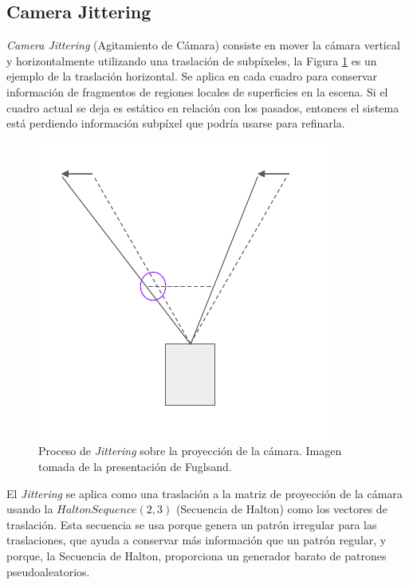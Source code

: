 \documentclass{cslthse-msc}
\begin{document}
\subsection{Camera Jittering}
\textit{Camera Jittering} (Agitamiento de Cámara) consiste en mover la cámara vertical y horizontalmente utilizando una traslación de subpíxeles, la Figura \ref{fig:camerajittering} es un ejemplo de la traslación horizontal. Se aplica en cada cuadro para conservar información de fragmentos de regiones locales de superficies en la escena. Si el cuadro actual se deja es estático en relación con los pasados, entonces el sistema está perdiendo información subpíxel que podría usarse para refinarla. ~\cite{Fuglsand2016, XU2016}

\begin{figure}[!hbt]
	\centering
	\includegraphics[scale=0.3]{images/camera_jitter.png}
	\caption{Proceso de \textit{Jittering} sobre la proyección de la cámara. Imagen tomada de la presentación de Fuglsand. \protect\cite{Fuglsand2016}}\label{fig:camerajittering}
\end{figure}

El \textit{Jittering} se aplica como una traslación a la matriz de proyección de la cámara usando la $Halton Sequence (2,3)$ (Secuencia de Halton) como los vectores de traslación. Esta secuencia se usa porque genera un patrón irregular para las traslaciones, que ayuda a conservar más información que un patrón regular, y porque, la Secuencia de Halton, proporciona un generador barato de patrones pseudoaleatorios. ~\cite{Fuglsand2016, XU2016}
\end{document}

